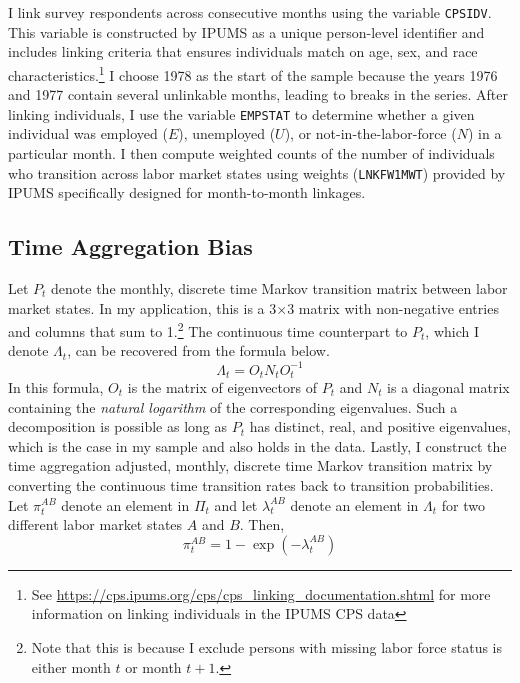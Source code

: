 \documentclass[12pt]{article}
\begin{document}
I link survey respondents across consecutive months using the variable \texttt{CPSIDV}. This variable is constructed by IPUMS as a unique person-level identifier and includes linking criteria that ensures individuals match on age, sex, and race characteristics.\footnote{See \url{https://cps.ipums.org/cps/cps_linking_documentation.shtml} for more information on linking individuals in the IPUMS CPS data} I choose 1978 as the start of the sample because the years 1976 and 1977 contain several unlinkable months, leading to breaks in the series. After linking individuals, I use the variable \texttt{EMPSTAT} to determine whether a given individual was employed ($E$), unemployed ($U$), or not-in-the-labor-force ($N$) in a particular month. I then compute weighted counts of the number of individuals who transition across labor market states using weights (\texttt{LNKFW1MWT}) provided by IPUMS specifically designed for month-to-month linkages. 

\subsection{Time Aggregation Bias}

Let $P_t$ denote the monthly, discrete time Markov transition matrix between labor market states. In my application, this is a 3$\times$3 matrix with non-negative entries and columns that sum to 1.\footnote{Note that this is because I exclude persons with missing labor force status is either month $t$ or month $t+1$.} The continuous time counterpart to $P_t$, which I denote $\Lambda_t$, can be recovered from the formula below.
\begin{equation}
\Lambda_t = O_t N_t O_t^{-1}
\end{equation}
In this formula, $O_t$ is the matrix of eigenvectors of $P_t$ and $N_t$ is a diagonal matrix containing the \textit{natural logarithm} of the corresponding eigenvalues. Such a decomposition is possible as long as $P_t$ has distinct, real, and positive eigenvalues, which is the case in my sample and also holds in the \cite{Shimer:2012aa} data. Lastly, I construct the time aggregation adjusted, monthly, discrete time Markov transition matrix by converting the continuous time transition rates back to transition probabilities.  Let $\pi_t^{AB}$ denote an element in $\Pi_t$ and let $\lambda_t^{AB}$ denote an element in $\Lambda_t$ for two different labor market states $A$ and $B$. Then, 
\begin{equation}
\pi_t^{AB} = 1 - \exp(-\lambda_t^{AB})
\end{equation}
\end{document}
